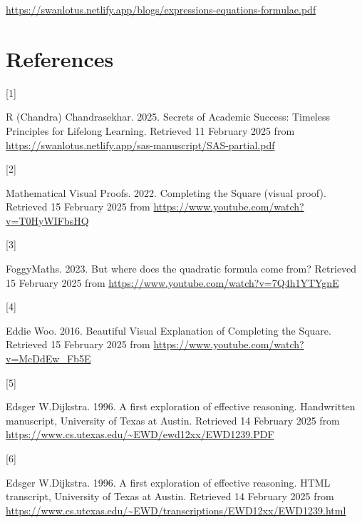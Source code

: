 \documentclass[
  a4paper,
]{article}
\newlength{\cslhangindent}
\newlength{\csllabelwidth}
\newenvironment{CSLReferences}[2] %
 {\begin{list}{}{%
  \setlength{\itemindent}{0pt}
  \setlength{\leftmargin}{0pt}
  \setlength{\parsep}{0pt}
  \ifodd #1
   \setlength{\leftmargin}{\cslhangindent}
   \setlength{\itemindent}{-1\cslhangindent}
  \fi
  \setlength{\itemsep}{#2\baselineskip}}}
 {\end{list}}
\newcommand{\CSLLeftMargin}[1]{\parbox[t]{\csllabelwidth}{\strut#1\strut}}
\newcommand{\CSLRightInline}[1]{\parbox[t]{\linewidth - \csllabelwidth}{\strut#1\strut}}
\begin{document}
\begin{small}

\begin{sffamily}

\url{https://swanlotus.netlify.app/blogs/expressions-equations-formulae.pdf}

\end{sffamily}

\end{small}

\section*{References}\label{bibliography}

\label{refs}
\begin{CSLReferences}{0}{0}
\CSLLeftMargin{{[}1{]} }%
\CSLRightInline{R (Chandra) Chandrasekhar. 2025. {Secrets of Academic
Success}: {Timeless Principles for Lifelong Learning}. Retrieved 11
February 2025 from
\url{https://swanlotus.netlify.app/sas-manuscript/SAS-partial.pdf}}

\CSLLeftMargin{{[}2{]} }%
\CSLRightInline{Mathematical Visual Proofs. 2022. {Completing the Square
(visual proof)}. Retrieved 15 February 2025 from
\url{https://www.youtube.com/watch?v=T0HyWIFbsHQ}}

\CSLLeftMargin{{[}3{]} }%
\CSLRightInline{FoggyMaths. 2023. {But where does the quadratic formula
come from?} Retrieved 15 February 2025 from
\url{https://www.youtube.com/watch?v=7Q4h1YTYgnE}}

\CSLLeftMargin{{[}4{]} }%
\CSLRightInline{Eddie Woo. 2016.{ Beautiful Visual Explanation of
Completing the Square}. Retrieved 15 February 2025 from
\url{https://www.youtube.com/watch?v=McDdEw_Fb5E}}

\CSLLeftMargin{{[}5{]} }%
\CSLRightInline{Edsger W.Dijkstra. 1996. {A first exploration of
effective reasoning}. {Handwritten manuscript, University of Texas at
Austin}. Retrieved 14 February 2025 from
\url{https://www.cs.utexas.edu/~EWD/ewd12xx/EWD1239.PDF}}

\CSLLeftMargin{{[}6{]} }%
\CSLRightInline{Edsger W.Dijkstra. 1996. {A first exploration of
effective reasoning}. {HTML transcript, University of Texas at Austin}.
Retrieved 14 February 2025 from
\url{https://www.cs.utexas.edu/~EWD/transcriptions/EWD12xx/EWD1239.html}}

\end{CSLReferences}
\end{document}
